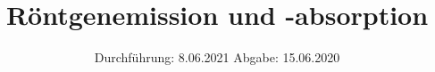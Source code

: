 

\subject{Versuch Nr.V602}
\title{Röntgenemission und -absorption}
\date{%
  Durchführung: 8.06.2021
  \hspace{3em}
  Abgabe: 15.06.2020
}



\maketitle
\thispagestyle{empty}
\tableofcontents
\newpage 






%

\nocite{*}

\printbibliography{}


